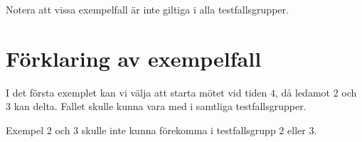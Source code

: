 Notera att vissa exempelfall är inte giltiga i alla testfallsgrupper.

\section*{Förklaring av exempelfall}
I det första exemplet kan vi välja att starta mötet vid tiden $4$, då ledamot $2$ och $3$ kan delta.
Fallet skulle kunna vara med i samtliga testfallsgrupper.

Exempel $2$ och $3$ skulle inte kunna förekomma i testfallsgrupp $2$ eller $3$.
